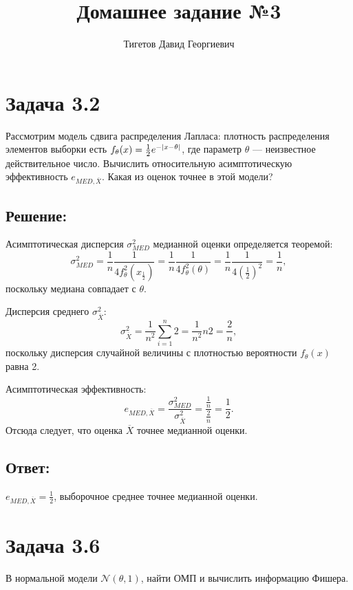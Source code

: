 \documentclass[12pt]{article}
\begin{document}
    \title{Домашнее задание №3}
    \author{Тигетов Давид Георгиевич}
    \date{}
    \maketitle

    \section*{Задача 3.2}
    Рассмотрим модель сдвига распределения Лапласа: плотность распределения элементов выборки есть $f_\theta(x) = \frac{1}{2} e^{-\left | x - \theta \right |}$, где параметр $\theta$ ---
    неизвестное действительное число. Вычислить относительную асимптотическую эффективность $e_{MED,\overline{X}}$. Какая из оценок точнее в этой модели?

    \subsection*{Решение:}
    Асимптотическая дисперсия $\sigma_{MED}^2$ медианной оценки определяется теоремой:
    \[
        \sigma_{MED}^2
        = \frac{1}{n} \frac{1}{4 f_\theta^2(x_\frac{1}{2})}
        = \frac{1}{n} \frac{1}{4 f_\theta^2(\theta)}
        = \frac{1}{n} \frac{1}{4 \left ( \frac{1}{2} \right )^2}
        = \frac{1}{n} ,
    \]
    поскольку медиана совпадает с $\theta$.

    Дисперсия среднего $\sigma_{\overline{X}}^2$:
    \[
        \sigma_{\overline{X}}^2
        = \frac{1}{n^2} \sum_{i=1}^n 2
        = \frac{1}{n^2} n 2
        = \frac{2}{n} ,
    \]
    поскольку дисперсия случайной величины с плотностью вероятности $f_\theta(x)$ равна 2.

    Асимптотическая эффективность:
    \[
        e_{MED,\overline{X}}
        = \frac{\sigma_{MED}^2}{\sigma_{\overline{X}}^2}
        = \frac{\frac{1}{n}}{\frac{2}{n}}
        = \frac{1}{2}.
    \]
    Отсюда следует, что оценка $\overline{X}$ точнее медианной оценки.

    \subsection*{Ответ:}
    $e_{MED,\overline{X}} = \frac{1}{2}$, выборочное среднее точнее медианной оценки.

    \section*{Задача 3.6}
    В нормальной модели $\mathcal{N} \left ( \theta, 1 \right )$, найти ОМП и вычислить информацию Фишера.
\end{document}
